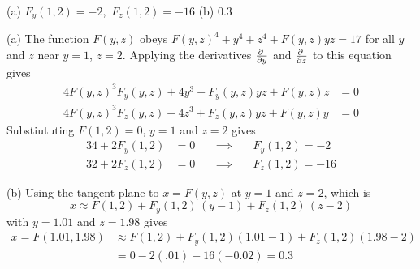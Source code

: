 %

\begin{answer}
(a) $F_y(1,2)=-2$,\ $F_z(1,2)=-16$\qquad
(b) $0.3$
\end{answer}

\begin{solution}
(a) The function $F(y,z)$ obeys $F(y,z)^4+y^4+z^4+F(y,z)yz=17$ for all $y$ and $z$ near $y=1$, $z=2$.
Applying the derivatives $\pdiff{}{y}$ and $\pdiff{}{z}$ 
to this equation gives
\begin{align*}
4F(y,z)^3F_y(y,z)+4y^3+F_y(y,z)yz +F(y,z)z&=0 \\
4F(y,z)^3F_z(y,z)+4z^3+F_z(y,z)yz +F(y,z)y&=0
\end{align*}
Substiututing $F(1,2)=0$, $y=1$ and $z=2$ gives
\begin{alignat*}{3}
4+2F_y(1,2)&=0 & &\ \implies\  & &F_y(1,2)=-2 \\
32+2F_z(1,2)&=0 & &\ \implies\  & & F_z(1,2)=-16
\end{alignat*}

(b) Using the tangent plane to $x=F(y,z)$ at $y=1$ and $z=2$, which is
\begin{equation*}
x \approx F(1,2) +F_y(1,2)\,(y-1) +F_z(1,2)\,(z-2)
\end{equation*}
with $y=1.01$ and $z=1.98$ gives
\begin{align*}
x=F(1.01, 1.98)
&\approx F(1,2)+F_y(1,2)(1.01-1)+F_z(1,2)(1.98-2) \\
&=0-2(.01)-16(-0.02)
=0.3
\end{align*}
\end{solution}